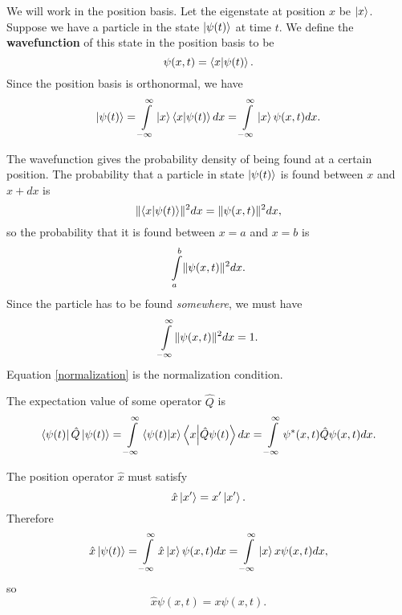 We will work in the position basis. Let the eigenstate at position $x$ be $\left| x \right\rangle$. Suppose we have a particle in the state $\left| \psi(t) \right\rangle $ at time $t$. We define the \textbf{wavefunction} of this state in the position basis to be 
\begin{equation*}
\psi (x, t) = \left\langle x \middle| \psi(t) \right\rangle.
\end{equation*}
Since the position basis is orthonormal, we have 
\begin{equation}
\left| \psi(t) \right\rangle = \int\limits_{-\infty}^{\infty} \left| x \right\rangle \left\langle x \middle| \psi(t) \right\rangle dx = \int\limits_{-\infty}^{\infty} \left| x \right\rangle \psi(x, t) dx.
\end{equation}

The wavefunction gives the probability density of being found at a certain position. The probability that a particle in state $\left| \psi(t) \right\rangle$ is found between $x$ and $x+dx$ is 
\begin{equation*}
\lVert\left\langle x \middle| \psi(t) \right\rangle\rVert^2 dx = \lVert\psi(x,t)\rVert^2 dx,
\end{equation*}
so the probability that it is found between $x=a$ and $x=b$ is 
\begin{equation*}
\int \limits_{a}^{b} \lVert\psi(x,t)\rVert^2 dx.
\end{equation*}
Since the particle has to be found \textit{somewhere}, we must have 
\begin{equation}
\int \limits_{-\infty}^{\infty} \lVert\psi(x,t)\rVert^2 dx = 1.
\label{normalization}
\end{equation}
Equation \ref{normalization} is the normalization condition.

The expectation value of some operator $\hat{Q}$ is 
\begin{equation*}
\left\langle \psi(t) \right| \hat{Q} \left| \psi(t) \right\rangle = \int\limits_{-\infty}^{\infty} \left\langle \psi(t) \middle| x \right\rangle  \left\langle x \middle| \hat{Q} \psi(t) \right\rangle dx = \int\limits_{-\infty}^{\infty} \psi^*(x,t) \hat{Q} \psi(x,t) dx.
\end{equation*}

The position operator $\hat{x}$ must satisfy 
\begin{equation*}
\hat{x} \left| x' \right\rangle = x' \left| x' \right\rangle.
\end{equation*}
Therefore 
\begin{equation*}
\hat{x} \left| \psi(t) \right\rangle = \int\limits_{-\infty}^{\infty} \hat{x} \left| x \right\rangle \psi(x,t) dx = \int\limits_{-\infty}^{\infty} \left| x \right\rangle x \psi(x,t) dx,
\end{equation*}
so 
\begin{equation}
\hat{x} \psi(x,t) = x \psi(x,t).
\end{equation}
